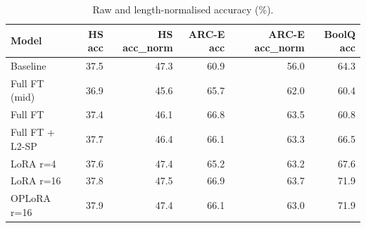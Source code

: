 \begin{table}[t]
\centering
\small
\begin{tabular}{lrrrrr}
\toprule
Model & HS acc & HS acc\_norm & ARC-E acc & ARC-E acc\_norm & BoolQ acc \\
\midrule
Baseline & 37.5 & 47.3 & 60.9 & 56.0 & 64.3 \\
Full FT (mid) & 36.9 & 45.6 & 65.7 & 62.0 & 60.4 \\
Full FT & 37.4 & 46.1 & 66.8 & 63.5 & 60.8 \\
Full FT + L2-SP & 37.7 & 46.4 & 66.1 & 63.3 & 66.5 \\
LoRA r=4 & 37.6 & 47.4 & 65.2 & 63.2 & 67.6 \\
LoRA r=16 & 37.8 & 47.5 & 66.9 & 63.7 & 71.9 \\
OPLoRA r=16 & 37.9 & 47.4 & 66.1 & 63.0 & 71.9 \\
\bottomrule
\end{tabular}
\caption{Raw and length-normalised accuracy (\%).}
\label{tab:t1-rawacc}
\end{table}
